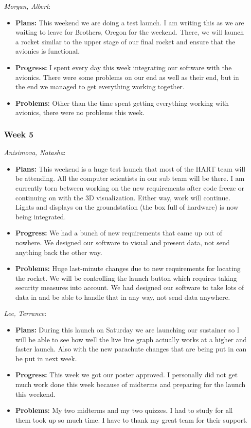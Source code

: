 \documentclass[10pt,draftclsnofoot,onecolumn]{IEEEtran}
\newcommand{\subsubsubsection}[1]{
	\hfill\break\textit{#1}:
}
\begin{document}
\subsubsubsection{Morgan, Albert}
\begin{itemize}
	\item \textbf{Plans: }
	This weekend we are doing a test launch. I am writing this as we are waiting to leave for Brothers, Oregon for the weekend. There, we will launch a rocket similar to the upper stage of our final rocket and ensure that the avionics is functional.
	\item \textbf{Progress: }
	I spent every day this week integrating our software with the avionics. There were some problems on our end as well as their end, but in the end we managed to get everything working together.
	\item \textbf{Problems: }
	Other than the time spent getting everything working with avionics, there were no problems this week.
\end{itemize}

\subsubsection{Week 5}
\subsubsubsection{Anisimova, Natasha}
\begin{itemize}
	\item \textbf{Plans: }This weekend is a huge test launch that most of the HART team will be attending. All the computer scientists in our sub team will be there. I am currently torn between working on the new requirements after code freeze or continuing on with the 3D visualization. Either way, work will continue. Lights and displays on the groundstation (the box full of hardware) is now being integrated.
	\item \textbf{Progress:  }
	We had a bunch of new requirements that came up out of nowhere. We designed our software to visual and present data, not send anything back the other way.
	\item \textbf{Problems: }
	Huge last-minute changes due to new requirements for locating the rocket. We will be controlling the launch button which requires taking security measures into account. We had designed our software to take lots of data in and be able to handle that in any way, not send data anywhere.
\end{itemize}

\subsubsubsection{Lee, Terrance}
\begin{itemize}
	\item \textbf{Plans: }
	During this launch on Saturday we are launching our sustainer so I will be able to see how well the live line graph actually works at a higher and faster launch. Also with the new parachute changes that are being put in can be put in next week.
	\item \textbf{Progress:  }
	This week we got our poster approved. I personally did not get much work done this week because of midterms and preparing for the launch this weekend.
	\item \textbf{Problems: }
	My two midterms and my two quizzes. I had to study for all them took up so much time. I have to thank my great team for their support.
\end{itemize}
\end{document}
